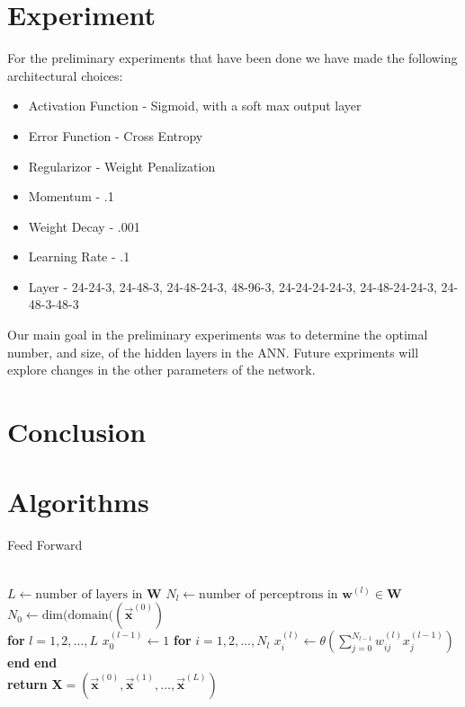 \documentclass[prl,amsmath,amssymb,floatfix,superscriptaddress,notitlepage,twocolumn]{revtex4}
\newcommand{\vc}[1]{\vec{\mathbf{#1}}} 								%
\begin{document}
\section{Experiment}



For the preliminary experiments that have been done we have made the following architectural choices:
\begin{itemize}
\item Activation Function - Sigmoid, with a soft max output layer
\item Error Function - Cross Entropy
\item Regularizor - Weight Penalization
\item Momentum - .1
\item Weight Decay - .001
\item Learning Rate - .1
\item Layer - {24-24-3, 24-48-3, 24-48-24-3, 48-96-3, 24-24-24-24-3, 24-48-24-24-3, 24-48-3-48-3 } 
\end{itemize}
Our main goal in the preliminary experiments was to determine the optimal number, and size, of the hidden layers in the ANN. Future expriments will explore changes in the other parameters of the network. 
\section{Conclusion}


\section{Algorithms}

\begin{algorithm}[H]
\caption{Feed Forward}\label{feed_forward}
\begin{algorithmic}[]
\Procedure{FeedForward}{$\vc x^{(0)}$,\textbf{W}}\\
\State $L \gets \text{number of layers in }\textbf{W}$
\State $N_l \gets \text{number of perceptrons in } \textbf{w}^{(l)}\in\textbf{W}$
\State $N_0 \gets \text{dim(domain(}(\vc x^{(0)})$\\

\State \textbf{for} $l=1,2,\dots,L$
\State \hspace{.25cm}$x^{(l-1)}_0 \gets 1$
\State \hspace{.25cm}\textbf{for} $i=1,2,\dots,N_l$
\State \hspace{.25cm}\hspace{.25cm}$x^{(l)}_i\gets\theta(\sum_{j=0}^{N_{l-1}}w^{(l)}_{ij}x^{(l-1)}_j)$
\State \hspace{.25cm}\textbf{end}
\State \textbf{end}\\

\State \textbf{return} \textbf{X}$=(\vc x^{(0)},\vc x^{(1)},\dots,\vc x^{(L)})$\\
\EndProcedure
\end{algorithmic}
\end{algorithm}
\end{document}
